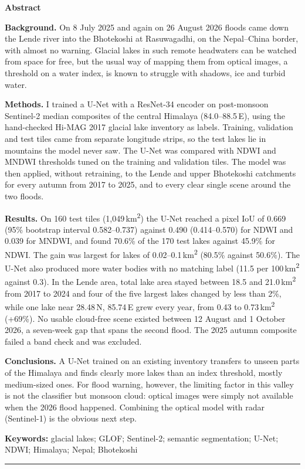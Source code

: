 \documentclass[11pt,a4paper]{article}
\newcommand{\kmsq}{\,km\textsuperscript{2}}
\begin{document}
{\small
\textbf{Abstract}

\textbf{Background.} On 8 July 2025 and again on 26 August 2026 floods came down the Lende river into the Bhotekoshi at Rasuwagadhi, on the Nepal--China border, with almost no warning. Glacial lakes in such remote headwaters can be watched from space for free, but the usual way of mapping them from optical images, a threshold on a water index, is known to struggle with shadows, ice and turbid water.

\textbf{Methods.} I trained a U-Net with a ResNet-34 encoder on post-monsoon Sentinel-2 median composites of the central Himalaya (84.0--88.5\,E), using the hand-checked Hi-MAG 2017 glacial lake inventory as labels. Training, validation and test tiles came from separate longitude strips, so the test lakes lie in mountains the model never saw. The U-Net was compared with NDWI and MNDWI thresholds tuned on the training and validation tiles. The model was then applied, without retraining, to the Lende and upper Bhotekoshi catchments for every autumn from 2017 to 2025, and to every clear single scene around the two floods.

\textbf{Results.} On 160 test tiles (1,049\kmsq) the U-Net reached a pixel IoU of 0.669 (95\% bootstrap interval 0.582--0.737) against 0.490 (0.414--0.570) for NDWI and 0.039 for MNDWI, and found 70.6\% of the 170 test lakes against 45.9\% for NDWI. The gain was largest for lakes of 0.02--0.1\kmsq{} (80.5\% against 50.6\%). The U-Net also produced more water bodies with no matching label (11.5 per 100\kmsq{} against 0.3). In the Lende area, total lake area stayed between 18.5 and 21.0\kmsq{} from 2017 to 2024 and four of the five largest lakes changed by less than 2\%, while one lake near 28.48\,N, 85.74\,E grew every year, from 0.43 to 0.73\kmsq{} (+69\%). No usable cloud-free scene existed between 12 August and 1 October 2026, a seven-week gap that spans the second flood. The 2025 autumn composite failed a band check and was excluded.

\textbf{Conclusions.} A U-Net trained on an existing inventory transfers to unseen parts of the Himalaya and finds clearly more lakes than an index threshold, mostly medium-sized ones. For flood warning, however, the limiting factor in this valley is not the classifier but monsoon cloud: optical images were simply not available when the 2026 flood happened. Combining the optical model with radar (Sentinel-1) is the obvious next step.

\textbf{Keywords:} glacial lakes; GLOF; Sentinel-2; semantic segmentation; U-Net; NDWI; Himalaya; Nepal; Bhotekoshi\par
}
\noindent\rule{\textwidth}{0.4pt}
\end{document}
